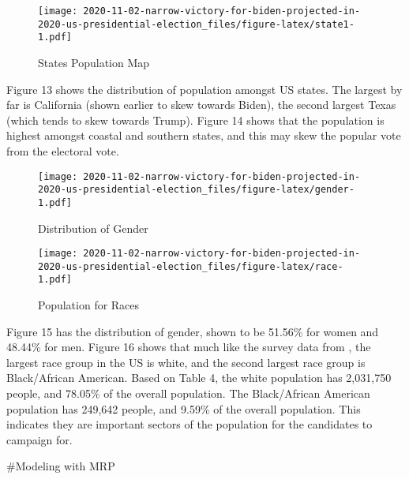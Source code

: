 \documentclass[
]{article}
\begin{document}
\begin{figure}
\centering
\texttt{[image: 2020-11-02-narrow-victory-for-biden-projected-in-2020-us-presidential-election\_files/figure-latex/state1-1.pdf]}
\caption{\label{fig:state1}States Population Map}
\end{figure}

Figure 13 shows the distribution of population amongst US states. The largest by far is California (shown earlier to skew towards Biden), the second largest Texas (which tends to skew towards Trump). Figure 14 shows that the population is highest amongst coastal and southern states, and this may skew the popular vote from the electoral vote.

\begin{figure}
\centering
\texttt{[image: 2020-11-02-narrow-victory-for-biden-projected-in-2020-us-presidential-election\_files/figure-latex/gender-1.pdf]}
\caption{\label{fig:gender}Distribution of Gender}
\end{figure}

\begin{figure}
\centering
\texttt{[image: 2020-11-02-narrow-victory-for-biden-projected-in-2020-us-presidential-election\_files/figure-latex/race-1.pdf]}
\caption{\label{fig:race}Population for Races}
\end{figure}

Figure 15 has the distribution of gender, shown to be 51.56\% for women and 48.44\% for men.
Figure 16 shows that much like the survey data from \citet{citeSurvey}, the largest race group in the US is white, and the second largest race group is Black/African American. Based on Table 4, the white population has 2,031,750 people, and 78.05\% of the overall population. The Black/African American population has 249,642 people, and 9.59\% of the overall population. This indicates they are important sectors of the population for the candidates to campaign for.

\#Modeling with MRP
\end{document}
